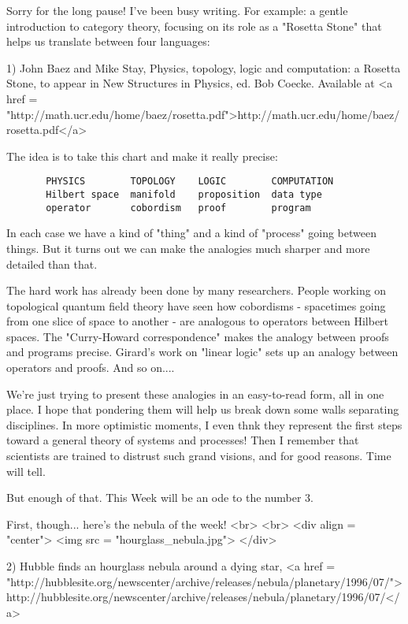 


Sorry for the long pause!  I've been busy writing.  For example: 
a gentle introduction to category theory, focusing on its role 
as a "Rosetta Stone" that helps us translate between four languages:

1) John Baez and Mike Stay, Physics, topology, logic and 
computation: a Rosetta Stone, to appear in New Structures in 
Physics, ed. Bob Coecke.  Available at 
<a href = "http://math.ucr.edu/home/baez/rosetta.pdf">http://math.ucr.edu/home/baez/rosetta.pdf</a>

The idea is to take this chart and make it really precise:

\begin{verbatim}
       PHYSICS        TOPOLOGY    LOGIC        COMPUTATION
       Hilbert space  manifold    proposition  data type
       operator       cobordism   proof        program
\end{verbatim}
    

In each case we have a kind of "thing" and a kind of
"process" going between things.  But it turns out we can
make the analogies much sharper and more detailed than that.

The hard work has already been done by many researchers. 
People working on topological quantum field theory have seen
how cobordisms - spacetimes going from one slice of space to
another - are analogous to operators between Hilbert spaces.
The "Curry-Howard correspondence" makes the analogy between
proofs and programs precise.  Girard's work on "linear logic" 
sets up an analogy between operators and proofs.  And so on....

We're just trying to present these analogies in an easy-to-read 
form, all in one place.  I hope that pondering them will help us
break down some walls separating disciplines.  In more optimistic 
moments, I even thnk they represent the first steps toward a 
general theory of systems and processes!  Then I remember that 
scientists are trained to distrust such grand visions, and for 
good reasons.  Time will tell.

But enough of that.  This Week will be an ode to the number 3. 

First, though... here's the nebula of the week!
<br>
<br>
<div align = "center">
<img src = "hourglass_nebula.jpg">
</div>

2) Hubble finds an hourglass nebula around a dying star,
<a href = "http://hubblesite.org/newscenter/archive/releases/nebula/planetary/1996/07/">http://hubblesite.org/newscenter/archive/releases/nebula/planetary/1996/07/</a>

